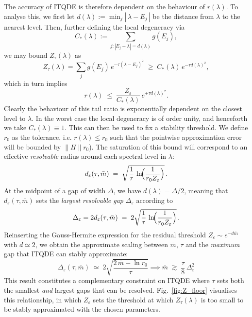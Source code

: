 \documentclass[reprint, aps,prx,showpacs,bibfootnote,preprintnumbers, mathtools, superscriptaddress, amsmath,amssymb]{revtex4-2}
\begin{document}
The accuracy of ITQDE is therefore dependent on the behaviour of $r(\lambda)$. To analyse this, we first let $d(\lambda):=\min_j |\,\lambda-E_j\,|$ be the distance from $\lambda$ to the nearest level. Then, further defining the local degeneracy via
\begin{equation}
    C_\ast(\lambda):=\sum_{j:|E_j-\lambda|=d(\lambda)} g(E_j),
    \end{equation}we may bound $Z_\tau (\lambda)$ as
\begin{equation}
Z_\tau(\lambda)=\sum_j g(E_j)\,e^{-\tau(\lambda-E_j)^2}
\;\ge\; C_\ast(\lambda)\,e^{-\tau d(\lambda)^2},
\end{equation}
which in turn implies
\begin{equation}
\label{eq:r-lambda}
r(\lambda)\;\le\;\frac{Z_\varepsilon}{C_\ast(\lambda)}\,e^{+\tau d(\lambda)^2}.
\end{equation}
Clearly the behaviour of this tail ratio is exponentially dependent on the closest level to $\lambda$. In the worst case the local degeneracy is of order unity, and henceforth we take ${C_\ast(\lambda)}\equiv 1$. This can then be used to fix a stability threshold. We define $r_0$ as the tolerance, i.e. $r(\lambda)\leq r_0$ such that the pointwise approximation error will be bounded by $\|H\|r_0$). The saturation of this bound will correspond to an effective \emph{resolvable} radius around each spectral level in $\lambda$:
\begin{equation}
\label{eq:d-eps}
d_\varepsilon(\tau,\bar m)\;=\;\sqrt{\frac{1}{\tau}\,\ln\!\Bigl(\frac{1}{r_0Z_\varepsilon}\Bigr)}\,.
\end{equation}
At the midpoint of a gap of width $\Delta$, we have $d(\lambda)=\Delta/2$, meaning that $d_\varepsilon(\tau,\bar m)$ sets the \textit{largest resolvable gap} $\Delta_\varepsilon$ according to
\begin{equation}
\label{eq:Delta-eps}
\Delta_\varepsilon=2d_\varepsilon(\tau,\bar m)
\;=\;2\sqrt{\frac{1}{\tau}\,\ln\!\Bigl(\frac{1}{r_0Z_\varepsilon}\Bigr)}\,.
\end{equation}
Reinserting the Gauss-Hermite expression for the residual threshold $Z_\varepsilon\sim e^{-d\bar m}$ with $d\simeq 2$, we obtain the approximate scaling between $\bar{m}$, $\tau$ and the \textit{maximum} gap that ITQDE can stably approximate:
\begin{equation}
\label{eq:Delta-eps-linear}
\Delta_\varepsilon(\tau,\bar m)\;\simeq\;2\sqrt{\frac{2\,\bar m-\ln r_0}{\tau}}
\implies
\bar m\;\gtrsim\;\frac{\tau}{8}\,\Delta_\varepsilon^2
\end{equation}
This result constitutes a complementary constraint on ITQDE where $\tau$ sets both the smallest \textit{and} largest gaps that can be resolved. Fig.~\ref{fig:Z_floor} visualises this relationship, in which $Z_\varepsilon$ sets the threshold at which $Z_\tau(\lambda)$ is too small to be stably approximated with the chosen parameters.
\end{document}
